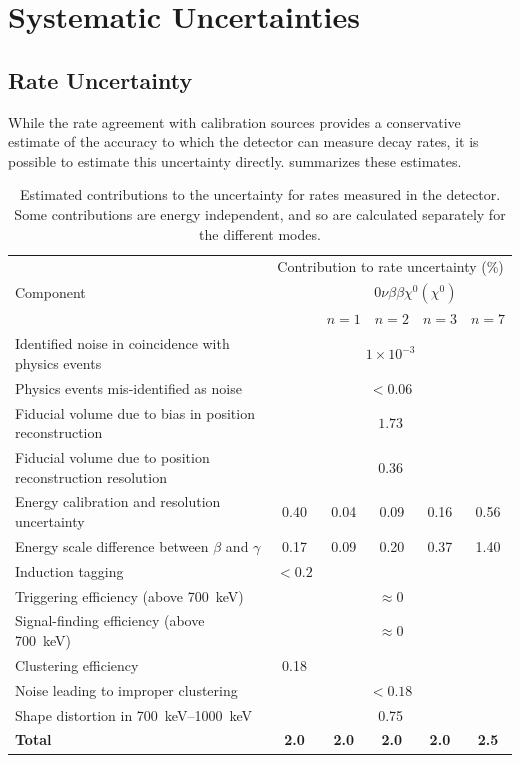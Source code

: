 \documentclass[herrin-thesis.tex]{subfiles}
\begin{document}
\section{Systematic Uncertainties}
\subsection{Rate Uncertainty}
\label{sec:analysis_rate_uncertainty}
While the rate agreement with calibration sources provides a conservative estimate of the accuracy to which the detector can measure decay rates, it is possible to estimate this uncertainty directly.  summarizes these estimates.

\begin{table}[htb]
\centering
\caption[Contributions to systematic uncertainty]{Estimated contributions to the uncertainty for rates measured in the detector. Some contributions are energy independent, and so are calculated separately for the different modes.}
\label{tab:analysis_normalization_uncertainaty}
\begin{tabular}{p{} c c c c c}\toprule
			&	\multicolumn{5}{c}{Contribution to rate uncertainty (\%)}				\\
Component	&	\twonu	&	\multicolumn{4}{c}{\(0\nu\beta\beta\chi^0(\chi^0)\)}		\\
			&			&	\(n = 1\)	&	\(n = 2\)	&	\(n = 3\)	&	\(n = 7\)	\\
Identified noise in coincidence with physics events		&	\multicolumn{5}{c}{\(1\times10^{-3}\)}		\\
Physics events mis-identified as noise				&	\multicolumn{5}{c}{\(<0.06\)}				\\
Fiducial volume due to bias in position reconstruction	&	\multicolumn{5}{c}{\(1.73\)}				\\
Fiducial volume due to position reconstruction resolution	&	\multicolumn{5}{c}{\(0.36\)}				\\
Energy calibration and resolution uncertainty			&	0.40	&	0.04	&	0.09	&	0.16	&	0.56	\\
Energy scale difference between \(\beta\) and \(\gamma\)	&	0.17	&	0.09	&	0.20	&	0.37	&	1.40	\\
Induction tagging								&	\(<0.2\)&		&		&		&		\\
Triggering efficiency	(above \SI{700}{\keV})			&	\multicolumn{5}{c}{\(\approx 0\)}			\\
Signal-finding efficiency (above \SI{700}{\keV})		&	\multicolumn{5}{c}{\(\approx 0\)}			\\
Clustering efficiency								&	0.18									\\
Noise leading to improper clustering				&	\multicolumn{5}{c}{\(<0.18\)}				\\
Shape distortion in \SIrange{700}{1000}{\keV}			&	\multicolumn{5}{c}{0.75}					\\\midrule
\textbf{Total}									&\textbf{2.0}&\textbf{2.0}&\textbf{2.0}&\textbf{2.0}&\textbf{2.5}\\\bottomrule
\end{tabular}
\end{table}
\end{document}
